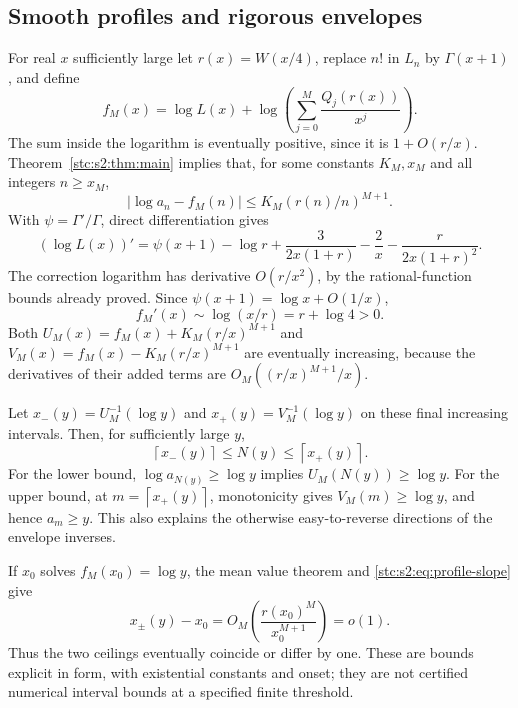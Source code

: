 \documentclass[11pt,letterpaper]{article}
\numberwithin{equation}{section}
\theoremstyle{remark}\newtheorem{remark}[theorem]{Remark}
\newcommand{\ceil}[1]{\left\lceil #1\right\rceil}
\begin{document}
\subsection{Smooth profiles and rigorous envelopes}
For real $x$ sufficiently large let $r(x)=W(x/4)$, replace $n!$ in $L_n$ by $\Gamma(x+1)$, and define
\begin{equation}\label{stc:s2:eq:fM}
 f_M(x)=\log L(x)+\log\left(\sum_{j=0}^M\frac{Q_j(r(x))}{x^j}\right).
\end{equation}
The sum inside the logarithm is eventually positive, since it is $1+O(r/x)$. Theorem~\ref{stc:s2:thm:main} implies that, for some constants $K_M,x_M$ and all integers $n\ge x_M$,
\begin{equation}\label{stc:s2:eq:integer-errors}
 |\log a_n-f_M(n)|\le K_M(r(n)/n)^{M+1}.
\end{equation}
With $\psi=\Gamma'/\Gamma$, direct differentiation gives
\begin{equation}\label{stc:s2:eq:Lderivative}
 (\log L(x))'=\psi(x+1)-\log r
 +\frac{3}{2x(1+r)}-\frac2x-\frac{r}{2x(1+r)^2}.
\end{equation}
The correction logarithm has derivative $O(r/x^2)$, by the rational-function bounds already proved. Since $\psi(x+1)=\log x+O(1/x)$,
\begin{equation}\label{stc:s2:eq:profile-slope}
 f_M'(x)\sim\log(x/r)=r+\log4>0.
\end{equation}
Both $U_M(x)=f_M(x)+K_M(r/x)^{M+1}$ and $V_M(x)=f_M(x)-K_M(r/x)^{M+1}$ are eventually increasing, because the derivatives of their added terms are $O_M((r/x)^{M+1}/x)$.

Let $x_-(y)=U_M^{-1}(\log y)$ and $x_+(y)=V_M^{-1}(\log y)$ on these final increasing intervals. Then, for sufficiently large $y$,
\begin{equation}\label{stc:s2:eq:profile-ceil}
 \ceil{x_-(y)}\le N(y)\le\ceil{x_+(y)}.
\end{equation}
For the lower bound, $\log a_{N(y)}\ge\log y$ implies $U_M(N(y))\ge\log y$. For the upper bound, at $m=\ceil{x_+(y)}$, monotonicity gives $V_M(m)\ge\log y$, and hence $a_m\ge y$. This also explains the otherwise easy-to-reverse directions of the envelope inverses.

If $x_0$ solves $f_M(x_0)=\log y$, the mean value theorem and \eqref{stc:s2:eq:profile-slope} give
\begin{equation}\label{stc:s2:eq:profile-width}
 x_\pm(y)-x_0=O_M\left(\frac{r(x_0)^M}{x_0^{M+1}}\right)=o(1).
\end{equation}
Thus the two ceilings eventually coincide or differ by one. These are bounds explicit in form, with existential constants and onset; they are not certified numerical interval bounds at a specified finite threshold.
\end{document}
